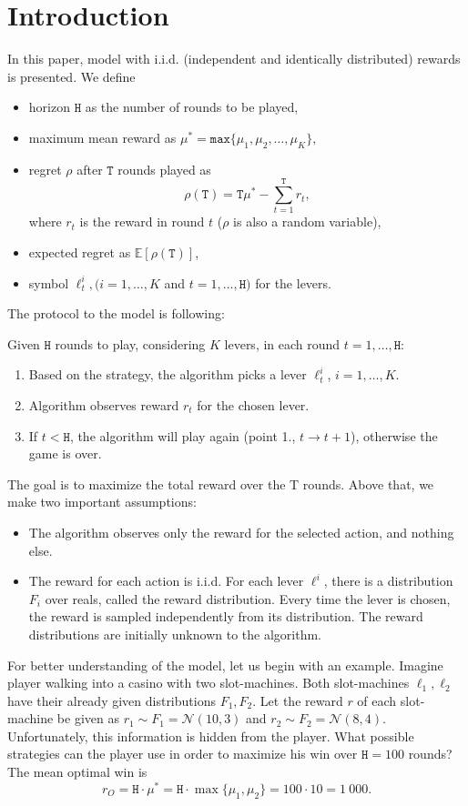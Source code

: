 \documentclass[11pt,american,czech]{article}
\newcommand{\T}{\mathtt{T}} %
\begin{document}
	\section*{Introduction}
	In this paper, model with i.i.d. (independent and identically distributed) rewards is presented. We define
	\begin{itemize}
		\item horizon $\mathtt{H}$ as the number of rounds to be played,
		\item maximum mean reward as $\mu^* = \mathtt{max}\{\mu_1,\mu_2,\dots,\mu_K\},$
		\item regret $\rho$ after $\T$ rounds played as
		$$\rho(\T) = \T\mu^* - \sum_{t=1}^{\T}r_t,$$
		where $r_t$ is the reward in round $t$ ($\rho$ is also a random variable),
		\item expected regret as $\mathbb{E}[\rho(\T)]$,
		\item symbol $\ell_t^i, (i=1,\dots,K$ and $ t=1,\dots,\mathtt{H})$ for the levers.
	\end{itemize}
	The protocol to the model is following:
	\begin{tcolorbox}[colframe=white]
		Given $\mathtt{H}$ rounds to play, considering $K$ levers, in each round $t=1,\dots,\mathtt{H}$:
		\begin{enumerate}
			\item Based on the strategy, the algorithm picks a lever $\ell_t^i$, $i=1,\dots,K$.
			\item Algorithm observes reward $r_t$ for the chosen lever.
			\item If $t<\mathtt{H}$, the algorithm will play again (point 1., $t\to t+1$), otherwise the game is over.
		\end{enumerate}
	\end{tcolorbox}
	The goal is to maximize the total reward over the T rounds. Above that, we make two important assumptions:
	\begin{itemize}
		\item The algorithm observes only the reward for the selected action, and nothing else.
		\item The reward for each action is  i.i.d. For each lever $\ell^i$, there is a distribution $F_{i}$ over reals, called the reward distribution. Every time the lever is chosen, the reward is sampled independently from its distribution. The reward distributions are initially unknown to the algorithm.
	\end{itemize}
	For better understanding of the model, let us begin with an example. Imagine player walking into a casino with two slot-machines. Both slot-machines $\ell_1,\ell_2$ have their already given distributions $F_1, F_2$. Let the reward $r$ of each slot-machine be given as $r_1\sim F_1=\mathcal{N}(10,3)$ and $r_2\sim F_2=\mathcal{N}(8,4)$. Unfortunately, this information is hidden from the player. What possible strategies can the player use in order to maximize his win over $\mathtt{H}=100$ rounds? The mean optimal win is $$r_O =\mathtt{H}\cdot \mu^* = \mathtt{H}\cdot \max\{\mu_1,\mu_2\} = 100\cdot10=1~000.$$
	
\end{document}
